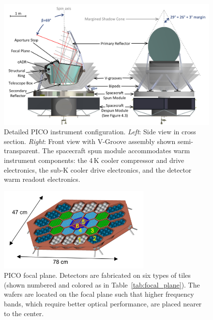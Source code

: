\begin{figure}
\begin{center}
\includegraphics[width=6.25in]{figures/InstrumentCAD.png}
\caption{\captiontext 
Detailed PICO instrument configuration. \textit{Left}: Side view in cross section. \textit{Right}: Front view with V-Groove assembly shown semi-transparent.  The spacecraft spun module accommodates warm instrument components: the 4\,K cooler compressor and drive electronics, the sub-K cooler drive electronics, and the detector warm readout electronics.\label{fig:InstrumentCAD}}
\end{center}
\end{figure}


\begin{figure}
\parbox{3in}{\centering
\includegraphics[width=3in]{figures/FocalPlaneMechanical.png}
}
\parbox{3.5in}{\centering
\caption{\captiontext 
PICO focal plane. Detectors are fabricated on six types of tiles (shown numbered and colored as in Table~\ref{tab:focal_plane}). The wafers are located on the focal plane such that higher frequency bands, which require better optical performance, are placed nearer to the center.\label{fig:FocalPlaneMechanical}}
}
\end{figure}

